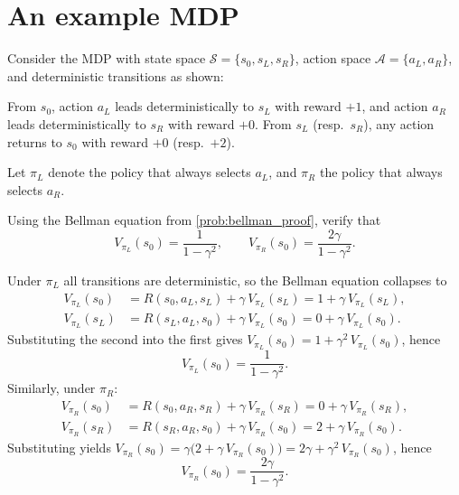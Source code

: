 \documentclass[11pt]{article}
\newcommand{\cS}{\mathcal{S}}
\newcommand{\cA}{\mathcal{A}}
\begin{document}

\section{An example MDP}\label{prob:small_mdp}

Consider the MDP with state space $\cS = \{s_0, s_L, s_R\}$, action space $\cA = \{a_L, a_R\}$, and deterministic transitions as shown:

\begin{center}
\end{center}

From $s_0$, action $a_L$ leads deterministically to $s_L$ with reward $+1$, and action $a_R$ leads deterministically to $s_R$ with reward $+0$. From $s_L$ (resp.\ $s_R$), any action returns to $s_0$ with reward $+0$ (resp.\ $+2$).

Let $\pi_L$ denote the policy that always selects $a_L$, and $\pi_R$ the policy that always selects $a_R$.

\begin{exercise}
\label{prob:small_mdp_values} Using the Bellman equation from \cref{prob:bellman_proof}, verify that
$$
V_{\pi_L}(s_0) = \frac{1}{1-\gamma^2}, \qquad V_{\pi_R}(s_0) = \frac{2\gamma}{1-\gamma^2}.
$$
\end{exercise}

\begin{solution}
Under $\pi_L$ all transitions are deterministic, so the Bellman equation collapses to
\begin{align*}
V_{\pi_L}(s_0) &= R(s_0, a_L, s_L) + \gamma\, V_{\pi_L}(s_L) = 1 + \gamma\, V_{\pi_L}(s_L), \\
V_{\pi_L}(s_L) &= R(s_L, a_L, s_0) + \gamma\, V_{\pi_L}(s_0) = 0 + \gamma\, V_{\pi_L}(s_0).
\end{align*}
Substituting the second into the first gives $V_{\pi_L}(s_0) = 1 + \gamma^2\, V_{\pi_L}(s_0)$, hence
$$
V_{\pi_L}(s_0) = \frac{1}{1-\gamma^2}.
$$
Similarly, under $\pi_R$:
\begin{align*}
V_{\pi_R}(s_0) &= R(s_0, a_R, s_R) + \gamma\, V_{\pi_R}(s_R) = 0 + \gamma\, V_{\pi_R}(s_R), \\
V_{\pi_R}(s_R) &= R(s_R, a_R, s_0) + \gamma\, V_{\pi_R}(s_0) = 2 + \gamma\, V_{\pi_R}(s_0).
\end{align*}
Substituting yields $V_{\pi_R}(s_0) = \gamma\bigl(2 + \gamma\, V_{\pi_R}(s_0)\bigr) = 2\gamma + \gamma^2\, V_{\pi_R}(s_0)$, hence
$$
V_{\pi_R}(s_0) = \frac{2\gamma}{1-\gamma^2}.
$$
\end{solution}
\end{document}

